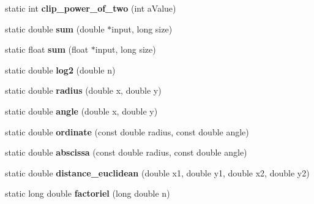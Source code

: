 \begin{DoxyCompactItemize}
\item 
\hypertarget{class_tools_a54311478fe37d7763d0dd6b276ffe264}{static int {\bfseries clip\-\_\-power\-\_\-of\-\_\-two} (int a\-Value)}\label{class_tools_a54311478fe37d7763d0dd6b276ffe264}

\item 
\hypertarget{class_tools_ac7491862b32867182ff02a7284f2b64b}{static double {\bfseries sum} (double $\ast$input, long size)}\label{class_tools_ac7491862b32867182ff02a7284f2b64b}

\item 
\hypertarget{class_tools_a262d35badff712a32e3d05b2a5d76b15}{static float {\bfseries sum} (float $\ast$input, long size)}\label{class_tools_a262d35badff712a32e3d05b2a5d76b15}

\item 
\hypertarget{class_tools_a20603042aa09ec3c70bfc60535d742c5}{static double {\bfseries log2} (double n)}\label{class_tools_a20603042aa09ec3c70bfc60535d742c5}

\item 
\hypertarget{class_tools_ab69175d8bad23e1cc752cde6eb728168}{static double {\bfseries radius} (double x, double y)}\label{class_tools_ab69175d8bad23e1cc752cde6eb728168}

\item 
\hypertarget{class_tools_acc03167734c0dfcd4e7f9d934e9084a8}{static double {\bfseries angle} (double x, double y)}\label{class_tools_acc03167734c0dfcd4e7f9d934e9084a8}

\item 
\hypertarget{class_tools_a9280334f677d92da2eacbe03f6abc7b0}{static double {\bfseries ordinate} (const double radius, const double angle)}\label{class_tools_a9280334f677d92da2eacbe03f6abc7b0}

\item 
\hypertarget{class_tools_a43c04420afbb92ef1d71051a2aa240c1}{static double {\bfseries abscissa} (const double radius, const double angle)}\label{class_tools_a43c04420afbb92ef1d71051a2aa240c1}

\item 
\hypertarget{class_tools_a33ab4d00a57f69a9e63ca64782f88a6d}{static double {\bfseries distance\-\_\-euclidean} (double x1, double y1, double x2, double y2)}\label{class_tools_a33ab4d00a57f69a9e63ca64782f88a6d}

\item 
\hypertarget{class_tools_a9d62e9d276681816acb5c810479afbd8}{static long double {\bfseries factoriel} (long double n)}\label{class_tools_a9d62e9d276681816acb5c810479afbd8}


\end{DoxyCompactItemize}
